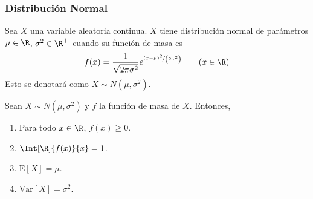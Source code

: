 \subsubsection{Distribución Normal}
\begin{Def}
  Sea $X$ una variable aleatoria continua. $X$ tiene distribución normal
  de parámetros $\mu\in\R$, $\sigma^2\in\R^+$ cuando su función de masa es
  \[
    f(x) = \dfrac{1}{\sqrt{2\pi\sigma^2}}
    e^{\nicefrac{(x-\mu)^2}{\left(2\sigma^2\right)}}
    \qquad (x\in\R)
  \]
  Esto se denotará como $X\sim N(\mu,\sigma^2)$.
\end{Def}
\begin{Teo}
  Sean $X\sim N(\mu,\sigma^2)$ y $f$ la función de masa de $X$. Entonces,
  \begin{enumerate}
    \item Para todo $x\in\R$, $f(x) \geq 0$.
    \item $\Int[\R]{f(x)}{x} = 1$.
    \item $\text{E}[X] = \mu$.
    \item $\text{Var}[X] = \sigma^2$.
  \end{enumerate}
\end{Teo}

